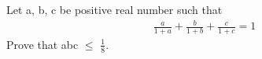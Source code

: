 \item Let a, b, c be positive real number such that 
\begin{align*}
\frac{a}{1+a} + \frac{b}{1+b} + \frac{c}{1+c} = 1
\end{align*}
Prove that abc $\leq$ $\frac{1}{8}$.

